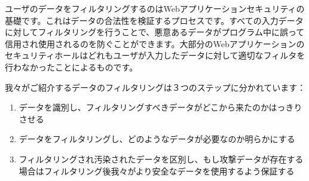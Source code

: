 ユーザのデータをフィルタリングするのはWebアプリケーションセキュリティの基礎です。これはデータの合法性を検証するプロセスです。すべての入力データに対してフィルタリングを行うことで、悪意あるデータがプログラム中に誤って信用され使用されるのを防ぐことができます。大部分のWebアプリケーションのセキュリティホールはどれもユーザが入力したデータに対して適切なフィルタを行わなかったことによるものです。

我々がご紹介するデータのフィルタリングは３つのステップに分かれています：

\begin{enumerate}
  \item データを識別し、フィルタリングすべきデータがどこから来たのかはっきりさせる
  \item データをフィルタリングし、どのようなデータが必要なのか明らかにする
  \item フィルタリングされ汚染されたデータを区別し、もし攻撃データが存在する場合はフィルタリング後我々がより安全なデータを使用するよう保証する
\end{enumerate}


